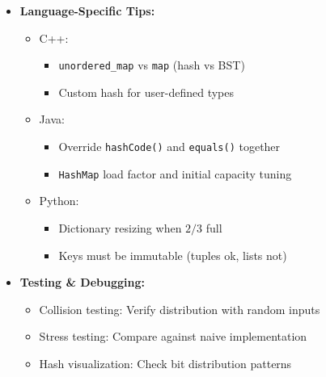 \documentclass[a4paper,10pt]{book}
\begin{document}
\begin{itemize}
    \item \textbf{Language-Specific Tips:}
    \begin{itemize}
        \item C++: 
        \begin{itemize}
            \item \texttt{unordered\_map} vs \texttt{map} (hash vs BST)
            \item Custom hash for user-defined types
        \end{itemize}
        \item Java:
        \begin{itemize}
            \item Override \texttt{hashCode()} and \texttt{equals()} together
            \item \texttt{HashMap} load factor and initial capacity tuning
        \end{itemize}
        \item Python:
        \begin{itemize}
            \item Dictionary resizing when $2/3$ full
            \item Keys must be immutable (tuples ok, lists not)
        \end{itemize}
    \end{itemize}
        
    \item \textbf{Testing \& Debugging:}
    \begin{itemize}
        \item Collision testing: Verify distribution with random inputs
        \item Stress testing: Compare against naive implementation
        \item Hash visualization: Check bit distribution patterns
    \end{itemize}
\end{itemize}
\end{document}
